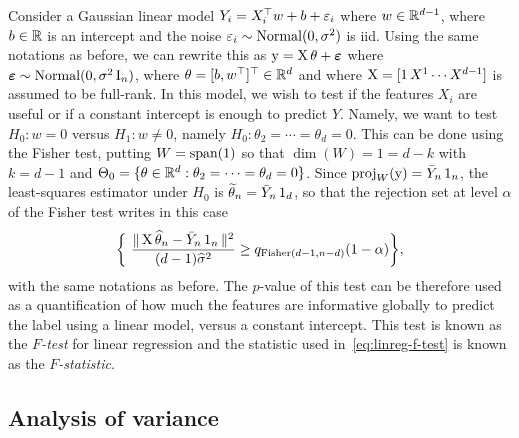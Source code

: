 \begin{example}
	Consider a Gaussian linear model $Y_i = X_i^\top w + b + \varepsilon_i$ where $w \in \mathbb R^{d-1}$, where $b \in \mathbb R$ is an intercept%
	and the noise $\varepsilon_i \sim \operatorname{Normal}(0, \sigma^2)$ is iid. Using the same notations as before, we can rewrite this as $\operatorname{{\boldsymbol y}} = \operatorname{{\boldsymbol X}} \theta + \operatorname{\boldsymbol \varepsilon}$ where $\operatorname{\boldsymbol \varepsilon} \sim \operatorname{Normal}(0, \sigma^2 \operatorname{{\boldsymbol I}}_n)$, where $\theta = [b, w^\top]^\top \in \mathbb R^d$ and where $\operatorname{{\boldsymbol X}} = [\operatorname{\boldsymbol 1} X^1 \cdots X^{d-1}]$ is assumed to be full-rank. In this model, we wish to test if the features $X_i$ are useful or if a constant intercept is enough to predict $Y$.
	Namely, we want to test $H_0 : w = 0$ versus $H_1 : w \neq 0$, namely $H_0 : \theta_2 = \cdots = \theta_d = 0$. This can be done using the Fisher test, putting $W = \operatorname*{span}(\operatorname{\boldsymbol 1})$ so that $\dim(W) = 1 = d - k$ with $k = d - 1$ and $\Theta_0 = \{ \theta \in \mathbb R^d : \theta_2 = \cdots = \theta_d = 0 \}$. 
	Since $\operatorname{proj}_W(\operatorname{{\boldsymbol y}}) = \bar Y_n \operatorname{\boldsymbol 1}_n$, the least-squares estimator under $H_0$ is $\widetilde \theta_n = \bar Y_n \operatorname{\boldsymbol 1}_d$, so that the rejection set at level $\alpha$ of the Fisher test writes in this case 
	\begin{equation}
		\label{eq:linreg-f-test}
		\bigg\{  \frac{\norm{\bX \wh \theta_n - \bar Y_n \bone_n}^2}{(d - 1) \wh \sigma^2}  
		\geq q_{\fis(d-1, n-d)}(1 - \alpha)  \bigg\},
	\end{equation}
	with the same notations as before. The $p$-value of this test can be therefore used as a quantification of how much the features are informative globally to predict the label using a linear model, versus a constant intercept. This test is known as the \emph{$F$-test} for linear regression and the statistic used in~\eqref{eq:linreg-f-test} is known as the \emph{$F$-statistic}.
\end{example}

\subsection{Analysis of variance} %
\label{sub:analysis_of_variance}

